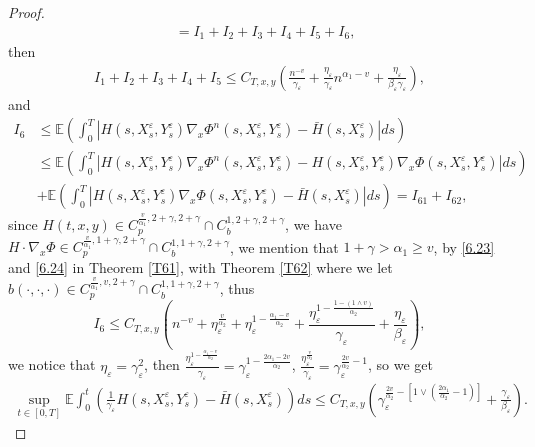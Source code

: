 \documentclass[11pt,reqno]{amsart}
\numberwithin{equation}{section}
\begin{document}
\begin{proof}
\begin{equation}
\begin{split}
		&=I_{1}+I_{2}+I_{3}+I_{4}+I_{5}+I_{6},
	\end{split}
\end{equation}
then 
\begin{equation}\label{6.50}
	\begin{split}
		I_{1}+I_{2}+I_{3}+I_{4}+I_{5}\leq C_{T,x,y}\left( \frac{n^{-v}}{\gamma_{\varepsilon}}+\frac{\eta_{\varepsilon}}{\gamma_{\varepsilon}}n^{\alpha_{1}-v}+\frac{\eta_{\varepsilon}}{\beta_{\varepsilon}\gamma_{\varepsilon}}\right) ,
	\end{split}
\end{equation}
and 
\begin{align}
		I_{6}&\leq\mathbb{E}\left( \int^{T}_{0}|H(s,X_{s}^{\varepsilon},Y_{s}^{\varepsilon})\nabla_{x} \Phi^{n}(s,X_{s}^{\varepsilon},Y_{s}^{\varepsilon})-\bar{H}(s,X_{s}^{\varepsilon})|ds\right)\nonumber \\
		&\leq\mathbb{E}\left( \int^{T}_{0}|H(s,X_{s}^{\varepsilon},Y_{s}^{\varepsilon})\nabla_{x} \Phi^{n}(s,X_{s}^{\varepsilon},Y_{s}^{\varepsilon})-H(s,X_{s}^{\varepsilon},Y_{s}^{\varepsilon})\nabla_{x} \Phi(s,X_{s}^{\varepsilon},Y_{s}^{\varepsilon})|ds\right)\nonumber\\ 
		&+\mathbb{E}\left( \int^{T}_{0}|H(s,X_{s}^{\varepsilon},Y_{s}^{\varepsilon})\nabla_{x} \Phi(s,X_{s}^{\varepsilon},Y_{s}^{\varepsilon})-\bar{H}(s,X_{s}^{\varepsilon})|ds\right)=I_{61}+I_{62},\label{6.51}
\end{align}
since $H(t,x,y)\in C_{p}^{\frac{v}{\alpha_{1}},2+\gamma,2+\gamma}\cap C_{b}^{1,2+\gamma,2+\gamma}$, we have $ H\cdot \nabla_{x} \Phi \in C_{p}^{\frac{v}{\alpha_{1}},1+\gamma,2+\gamma}\cap C_{b}^{1,1+\gamma,2+\gamma}$,  we mention that $1+\gamma>\alpha_{1}\geq v$, by \eqref{6.23} and \eqref{6.24} in Theorem \ref{T61}, with Theorem \ref{T62} where we let $b(\cdot,\cdot,\cdot)\in C_{p}^{\frac{v}{\alpha_{1}},v,2+\gamma}\cap C_{b}^{1,1+\gamma,2+\gamma}$, thus
 $$I_{6}\leq C_{T,x,y}\left( n^{-v}+\eta_{\varepsilon}^{\frac{v}{\alpha_{2}}}+\eta_{\varepsilon}^{1-\frac{\alpha_{1}-v}{\alpha_{2}}}+\frac{\eta_{\varepsilon}^{1-\frac{1-(1\wedge v)}{\alpha_{2}}}}{\gamma_{\varepsilon}}+\frac{\eta_{\varepsilon}}{\beta_{\varepsilon}}\right) ,$$
we notice that $\eta_{\varepsilon}=\gamma^{2}_{\varepsilon}$, then $\frac{ \eta_{\varepsilon}^{1-\frac{\alpha_{1}-v}{\alpha_{2}}}}{\gamma_{\varepsilon}}=\gamma_{\varepsilon}^{1-\frac{2\alpha_{1}-2v}{\alpha_{2}}}$, $\frac{ \eta_{\varepsilon}^{\frac{v}{\alpha_{2}}}}{\gamma_{\varepsilon}}=\gamma_{\varepsilon}^{\frac{2v}{\alpha_{2}}-1}$, so  we get
\begin{equation}\label{6.52}
	\begin{split}
		\sup_{t\in [0,T]}\mathbb{E}  \int_{0}^{t}\left(  \frac{1}{\gamma_{\varepsilon}}H(s,X_{s}^{\varepsilon},Y_{s}^{\varepsilon})- \bar{H}(s,X_{s}^{\varepsilon})\right) ds  \leq C_{T,x,y}\left( \gamma_{\varepsilon}^{\frac{2v}{\alpha_{2}}-\left[ 1\vee \left( \frac{2\alpha_{1}}{\alpha_{2}}-1\right)   \right] }+\frac{\gamma_{\varepsilon}}{\beta_{\varepsilon}}\right) .
	\end{split}
\end{equation}



\end{proof}
\end{document}
